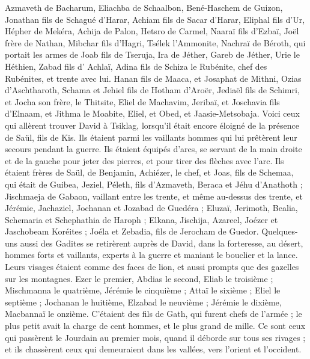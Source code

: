 \begin{multicols}{2}
Azmaveth de Bacharum, Eliachba de Schaalbon,
Bené-Haschem de Guizon, Jonathan fils de Schagué d'Harar,
Achiam fils de Sacar d'Harar, Eliphal fils d'Ur,
Hépher de Mekéra, Achija de Palon,
Hetsro de Carmel, Naaraï fils d'Ezbaï,
Joël frère de Nathan, Mibchar fils d'Hagri,
Tsélek l'Ammonite, Nachraï de Béroth, qui portait les armes de Joab fils de Tseruja,
Ira de Jéther, Gareb de Jéther,
Urie le Héthien, Zabad fils d' Achlaï,
Adina fils de Schiza le Rubénite, chef des Rubénites, et trente avec lui.
Hanan fils de Maaca, et Josaphat de Mithni,
Ozias d'Aschtharoth, Schama et Jehiel fils de Hotham d'Aroër,
Jediaël fils de Schimri, et Jocha son frère, le Thitsite,
Eliel de Machavim, Jeribaï, et Joschavia fils d'Elnaam, et Jithma le Moabite,
Eliel, et Obed, et Jaasie-Metsobaja.
\VerseOne{}Voici ceux qui allèrent trouver David à Tsiklag, lorsqu'il était encore éloigné de la présence de Saül, fils de Kis. Ils étaient parmi les vaillants hommes qui lui prêtèrent leur secours pendant la guerre.
Ils étaient équipés d'arcs, se servant de la main droite et de la gauche pour jeter des pierres, et pour tirer des flèches avec l'arc. Ils étaient frères de Saül, de Benjamin,
Achiézer, le chef, et Joas, fils de Schemaa, qui était de Guibea, Jeziel, Péleth, fils d'Azmaveth, Beraca et Jéhu d'Anathoth ;
Jischmaeja de Gabaon, vaillant entre les trente, et même au-dessus des trente, et Jérémie, Jachaziel, Jochanan et Jozabad de Guedéra ;
Eluzaï, Jerimoth, Bealia, Schemaria et Schephathia de Haroph ;
Elkana, Jischija, Azareel, Joézer et Jaschobeam Koréites ;
Joéla et Zebadia, fils de Jerocham de Guedor.
Quelques-uns aussi des Gadites se retirèrent auprès de David, dans la forteresse, au désert, hommes forts et vaillants, experts à la guerre et maniant le bouclier et la lance. Leurs visages étaient comme des faces de lion, et aussi prompts que des gazelles sur les montagnes.
Ezer le premier, Abdias le second, Eliab le troisième ;
Mischmanna le quatrième, Jérémie le cinquième ;
Attaï le sixième ; Eliel le septième ;
Jochanan le huitième, Elzabad le neuvième ;
Jérémie le dixième, Macbannaï le onzième.
C’étaient des fils de Gath, qui furent chefs de l'armée ; le plus petit avait la charge de cent hommes, et le plus grand de mille.
Ce sont ceux qui passèrent le Jourdain au premier mois, quand il déborde sur tous ses rivages ; et ils chassèrent ceux qui demeuraient dans les vallées, vers l'orient et l'occident.

\end{multicols}
